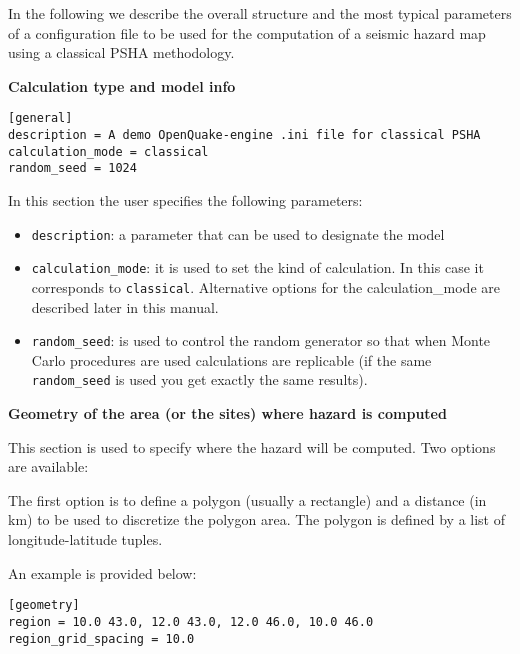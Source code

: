 In the following we describe the overall structure and the most typical
parameters of a configuration file to be used for the computation of a
seismic hazard map using a classical PSHA methodology.


\textbf{Calculation type and model info}

\begin{verbatim}
[general]
description = A demo OpenQuake-engine .ini file for classical PSHA
calculation_mode = classical
random_seed = 1024
\end{verbatim}

In this section the user specifies the following parameters:

\begin{itemize}

    \item \texttt{description}: a parameter that can be used to designate
    the model

    \item \texttt{calculation\_mode}: it is used to set the kind of
    calculation. In this case it corresponds to \texttt{classical}.
    Alternative options for the calculation\_mode are described later in this
    manual.

    \item \texttt{random\_seed}: is used to control the random generator
    so that when Monte Carlo procedures are used calculations are
    replicable (if the same \texttt{random\_seed} is used you get exactly
    the same results).

\end{itemize}

\textbf{Geometry of the area (or the sites) where hazard is computed}

This section is used to specify where the hazard will be computed. Two
options are available:

The first option is to define a polygon (usually a rectangle) and a distance
(in km) to be used to discretize the  polygon area. The polygon is defined by
a list of longitude-latitude tuples.

An example is provided below:

\begin{verbatim}
[geometry]
region = 10.0 43.0, 12.0 43.0, 12.0 46.0, 10.0 46.0
region_grid_spacing = 10.0
\end{verbatim}

